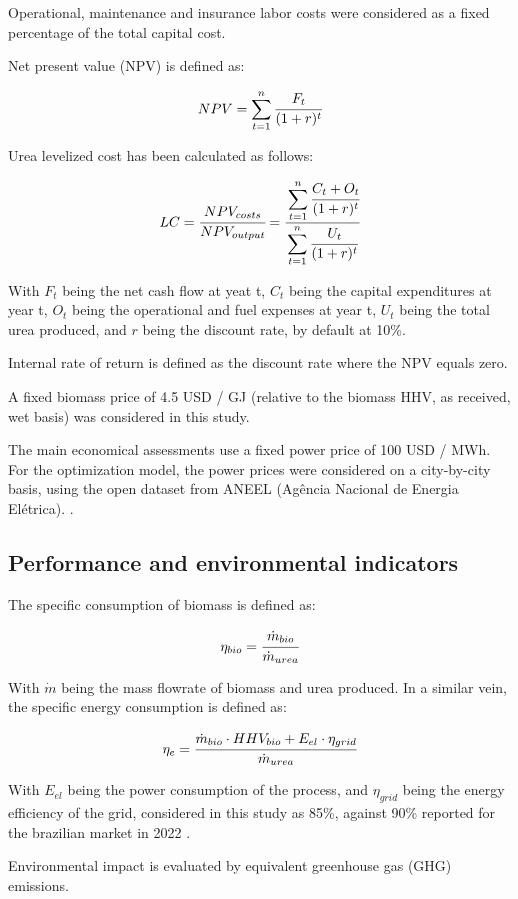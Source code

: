 \documentclass[a4paper, titlepage]{article}
\begin{document}
Operational, maintenance and insurance labor costs were considered as a fixed percentage of the total capital cost.

Net present value (NPV) is defined as:

\begin{equation}
	NPV = \sum_{t=1}^n \cfrac{F_t}{(1+r)^t}
\end{equation}

Urea levelized cost has been calculated as follows:

\begin{equation}
	LC = \cfrac{NPV_{costs}}{NPV_{output}} = \cfrac{\displaystyle\sum_{t=1}^n \cfrac{C_t + O_t}{(1+r)^t}}{\displaystyle\sum_{t=1}^n \cfrac{U_t}{(1+r)^t}}
\end{equation}

With $F_t$ being the net cash flow at yeat t, $C_t$ being the capital expenditures at year t, $O_t$ being the
operational and fuel expenses at year t, $U_t$ being the total urea produced, and $r$ being the discount rate,
by default at 10\%.

Internal rate of return is defined as the discount rate where the NPV equals zero.

A fixed biomass price of 4.5 USD / GJ (relative to the biomass HHV, as received, wet basis) was considered in this study.

The main economical assessments use a fixed power price of 100 USD / MWh. For the optimization model, the power prices
were considered on a city-by-city basis, using the open dataset from ANEEL (Agência Nacional de Energia Elétrica).
\cite{ANEELPortalReports}.

\subsection{Performance and environmental indicators}

The specific consumption of biomass is defined as:

\begin{equation}
	\eta_{bio} = \cfrac{\dot m_{bio}}{\dot m_{urea}}
\end{equation}

With $\dot m$ being the mass flowrate of biomass and urea produced. In a similar vein, the specific energy consumption
is defined as:

\begin{equation}
	\eta _e = \cfrac{\dot m_{bio} \cdot HHV_{bio} + E_{el} \cdot \eta _{grid}}{\dot m_{urea}}
\end{equation}

With $E_{el}$ being the power consumption of the process, and $\eta _{grid}$ being the energy efficiency of the grid,
considered in this study as 85\%, against 90\% reported for the brazilian market in 2022
\cite{epeBENBalancoEnergetico2023}.

Environmental impact is evaluated by equivalent greenhouse gas (GHG) emissions. \textcite{jonkerEconomicPerformanceGHG2019}








\printbibliography{}
\end{document}
